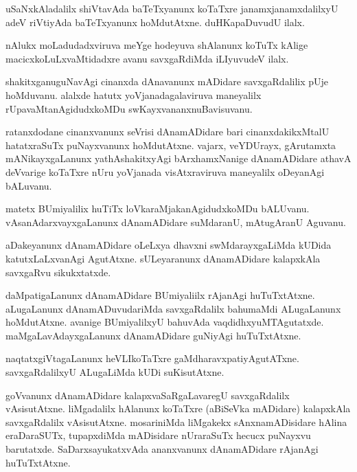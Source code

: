 \documentclass{article}
\begin{document}
\begin{mng}%
uSaNxkAladalilx shiVtavAda baTeTxyanunx koTaTxre janamxjanamxdalilxyU 
adeV riVtiyAda baTeTxyanunx hoMdutAtxne. duHKapaDuvudU ilalx.
\end{mng}

\begin{mng}%
nAlukx moLadudadxviruva meYge hodeyuva shAlanunx koTuTx kAlige 
macicxkoLuLxvaMtidadxre avanu savxgaRdiMda iLIyuvudeV ilalx.
\end{mng}

\begin{mng}%
shakitxganuguNavAgi cinanxda dAnavanunx mADidare savxgaRdalilix pUje 
hoMduvanu. alalxde hatutx yoVjanadagalaviruva maneyalilx 
rUpavaMtanAgidudxkoMDu swKayxvananxnuBavisuvanu.
\end{mng}

\begin{mng}%
ratanxdodane cinanxvanunx seVrisi dAnamADidare bari cinanxdakikxMtalU 
hatatxraSuTx puNayxvanunx hoMdutAtxne. vajarx, veYDUrayx, gArutamxta 
mANikayxgaLanunx yathAshakitxyAgi bArxhamxNanige dAnamADidare athavA 
deVvarige koTaTxre nUru yoVjanada visAtxraviruva maneyalilx oDeyanAgi 
bALuvanu.
\end{mng}

\begin{mng}%
matetx BUmiyalilix huTiTx loVkaraMjakanAgidudxkoMDu bALUvanu. 
vAsanAdarxvayxgaLanunx dAnamADidare suMdaranU, mAtugAranU Aguvanu.
\end{mng}

\begin{mng}%
aDakeyanunx dAnamADidare oLeLxya dhavxni swMdarayxgaLiMda kUDida 
katutxLaLxvanAgi AgutAtxne. sULeyaranunx dAnamADidare kalapxkAla 
savxgaRvu sikukxtatxde.
\end{mng}

\begin{mng}%
daMpatigaLanunx dAnamADidare BUmiyaliilx rAjanAgi huTuTxtAtxne. 
aLugaLanunx dAnamADuvudariMda savxgaRdalilx bahumaMdi ALugaLanunx 
hoMdutAtxne. avanige BUmiyalilxyU bahuvAda vaqdidhxyuMTAgutatxde. 
maMgaLavAdayxgaLanunx dAnamADidare guNiyAgi huTuTxtAtxne.
\end{mng}

\begin{mng}%
naqtatxgiVtagaLanunx heVLIkoTaTxre gaMdharavxpatiyAgutATxne. 
savxgaRdalilxyU ALugaLiMda kUDi suKisutAtxne.
\end{mng}

\begin{mng}%
goVvanunx dAnamADidare kalapxvaSaRgaLavaregU savxgaRdalilx 
vAsisutAtxne. liMgadalilx hAlanunx koTaTxre (aBiSeVka mADidare) 
kalapxkAla savxgaRdalilx vAsisutAtxne. mosariniMda liMgakekx 
sAnxnamADisidare hAlina eraDaraSUTx, tupapxdiMda mADisidare nUraraSuTx 
hecucx puNayxvu barutatxde. SaDarxsayukatxvAda ananxvanunx 
dAnamADidare rAjanAgi huTuTxtAtxne.
\end{mng}
\end{document}
